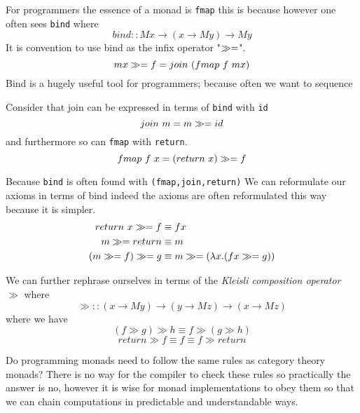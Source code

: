 For programmers the essence of a monad is \texttt{fmap}
this is because
however one often sees \texttt{bind} where
\begin{equation}
    bind :: M x \rightarrow (x \rightarrow M y) \rightarrow M y
\end{equation}
It is convention to use bind as the infix operator "$\gg=$".
\begin{equation}
    mx \gg= f = join\ (fmap\ f\ mx)
\end{equation}
Bind is a hugely useful tool for programmers;
because often we want to sequence

Consider that join can be expressed in terms of \texttt{bind} with \texttt{id}
\begin{equation}
    join\ m = m \gg= id
\end{equation}
and furthermore so can \texttt{fmap} with \texttt{return}.
\begin{equation}
    fmap\ f\ x = (return\ x) \bind f
\end{equation}

Because \texttt{bind} is often found with \texttt{(fmap,join,return)}
We can reformulate our axioms in terms of bind
indeed the axioms are often reformulated this way because it is simpler.
\begin{equation}
  \begin{split}
      return\ x \gg= f     &\equiv f x \\
             m \gg= return &\equiv m   \\
      (m \gg= f) \gg= g     &\equiv m \gg= (\lambda x.(fx \gg= g))
  \end{split}
\end{equation}

We can further rephrase ourselves in terms
of the \textit{Kleisli composition operator} $\gg$ where
\begin{equation}
    \gg :: (x \rightarrow M y) \rightarrow (y \rightarrow M z) \rightarrow (x \rightarrow M z)
\end{equation}
where we have
\begin{equation}
    (f \gg g) \gg h \equiv f \gg (g \gg h)
\end{equation}
\begin{equation}
    return \gg f \equiv f \equiv f \gg return
\end{equation}

Do programming monads need to follow the same rules as category theory monads?
There is no way for the compiler to check these rules so practically the answer is no,
however it is wise for monad implementations to obey them so that
we can chain computations in predictable and understandable ways.

